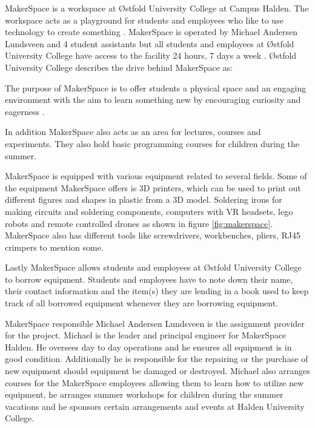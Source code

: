 MakerSpace is a workspace at Østfold University College at Campus Halden. 
The workspace acts as a playground for students and employees who like to use technology to create something \cite{what-is-makerspace}.
MakerSpace is operated by Michael Andersen Lundsveen and 4 student assistants but all students and employees at Østfold University College have access to the facility 24 hours, 7 days a week
\cite{what-is-makerspace}.
Østfold University College describes the drive behind MakerSpace as:

\begin{displayquote}
The purpose of MakerSpace is to offer students a physical space and an engaging environment with the aim to learn something new by encouraging curiosity and eagerness \cite{what-is-makerspace}.
\end{displayquote}
In addition MakerSpace also acts as an area for lectures, courses and experiments.
They also hold basic programming courses for children during the summer.

MakerSpace is equipped with various equipment related to several fields.
Some of the equipment MakerSpace offers is 3D printers, which can be used to print out different figures and shapes in plastic from a 3D model. Soldering irons for making circuits and soldering components, computers with VR headsets, lego robots and remote controlled drones as shown in figure \ref{fig:makerspace}. MakerSpace also has different tools like screwdrivers, workbenches, pliers, RJ45 crimpers to mention some.

Lastly MakerSpace allows students and employees at Østfold University College to borrow equipment.
Students and employees have to note down their name, their contact information and the item(s) they are lending in a book used to keep track of all borrowed equipment whenever they are borrowing equipment.

MakerSpace responsible Michael Andersen Lundsveen is the assignment provider for the project. 
Michael is the leader and principal engineer for MakerSpace Halden.
He oversees day to day operations and he ensures all equipment is in good condition.
Additionally he is responsible for the repairing or the purchase of new equipment should equipment be damaged or destroyed.
Michael also arranges courses for the MakerSpace employees allowing them to learn how to utilize new equipment, he arranges summer workshops for children during the summer vacations and he sponsors certain arrangements and events at Halden University College.

